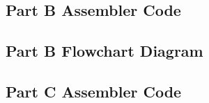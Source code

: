 \documentclass[letterpaper]{article}
\begin{document}
  \subsection{Part B Assembler Code}
    
\newpage
  \subsection{Part B Flowchart Diagram}
  \vspace{2cm}
    \noindent{}
\newpage
\subsection{Part C Assembler Code}
  
\newpage
\end{document}
